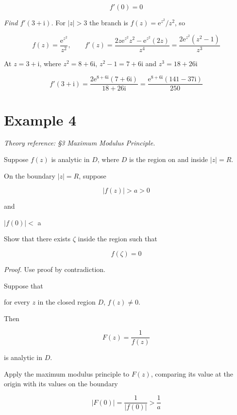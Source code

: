 \documentclass[11pt,a4paper]{article}
\theoremstyle{definition}
\theoremstyle{plain}
\begin{document}
\[
f'(0) = 0
\]

\textit{Find $f'(3 + \mathrm{i})$.} For $\vert{}z\vert{} > 3$ the branch is $f(z) = \mathrm{e}^{z^{2}}/z^{2}$, so

\[
f(z) = \frac{\mathrm{e}^{z^{2}}}{z^{2}}, \qquad
f'(z) = \frac{2z\mathrm{e}^{z^{2}}z^{2} - \mathrm{e}^{z^{2}}(2z)}{z^{4}}
= \frac{2\mathrm{e}^{z^{2}}(z^{2} - 1)}{z^{3}}
\]

At $z = 3 + \mathrm{i}$, where $z^{2} = 8 + 6\mathrm{i}$, $z^{2} - 1 = 7 + 6\mathrm{i}$ and $z^{3} = 18 + 26\mathrm{i}$

\[
f'(3 + \mathrm{i}) = \frac{2\mathrm{e}^{8 + 6\mathrm{i}}(7 + 6\mathrm{i})}{18 + 26\mathrm{i}}
= \frac{\mathrm{e}^{8 + 6\mathrm{i}}(141 - 37\mathrm{i})}{250}
\]

\section*{Example 4}

\textit{Theory reference: §3 Maximum Modulus Principle.}

Suppose $f(z)$ is analytic in $D$, where $D$ is the region on and inside $\vert{}z\vert{} = R$.

On the boundary $\vert{}z\vert{} = R$, suppose

\begin{equation}
\vert{}f(z)\vert{} > a > 0
\end{equation}

and

$\vert{}f(0)\vert{} <$ a

Show that there exists $\zeta$ inside the region such that

\begin{equation}
f(\zeta) = 0
\end{equation}

\textit{Proof.} Use proof by contradiction.

Suppose that

for every $z$ in the closed region $D$, $f(z) \ne 0$.

Then

\begin{equation}
F(z) = \frac{1}{f(z)}
\end{equation}

is analytic in $D$.

Apply the maximum modulus principle to $F(z)$, comparing its value at the origin with its values on the boundary

\begin{equation}
\vert{}F(0)\vert{} = \frac{1}{\vert{}f(0)\vert{}} > \frac{1}{a}
\end{equation}
\end{document}
